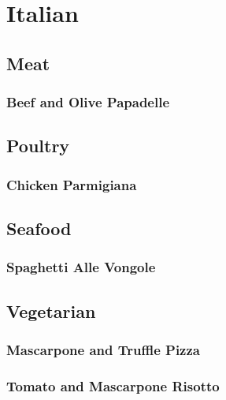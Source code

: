 \documentclass[a4paper]{book}
\begin{document}
\chapter{Italian}
\section{Meat}
\subsection{Beef and Olive Papadelle}
\section{Poultry}
\subsection{Chicken Parmigiana}
\section{Seafood}
\subsection{Spaghetti Alle Vongole}
\section{Vegetarian}
\subsection{Mascarpone and Truffle Pizza}
\subsection{Tomato and Mascarpone Risotto}
\end{document}
